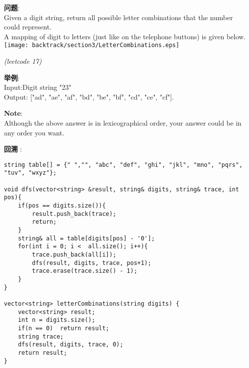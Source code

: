     
\begin{description}
    \item{\textbf{问题}}:\\
Given a digit string, return all possible letter combinations that the number could represent.\\
A mapping of digit to letters (just like on the telephone buttons) is given below.\\

\texttt{[image: backtrack/section3/LetterCombinations.eps]}

\textit{(leetcode 17)}
	\item{\textbf{举例}}:\\
Input:Digit string "23"\\
Output: ["ad", "ae", "af", "bd", "be", "bf", "cd", "ce", "cf"].\\
	\item{\textbf{Note}}:\\
Although the above answer is in lexicographical order, your answer could be in any order you want.
    \item{\textbf{回溯}} : 
    \begin{lstlisting}
string table[] = {" ","", "abc", "def", "ghi", "jkl", "mno", "pqrs", "tuv", "wxyz"};

void dfs(vector<string> &result, string& digits, string& trace, int pos){
	if(pos == digits.size()){
		result.push_back(trace);
		return;
	}
	string& all = table[digits[pos] - '0'];
	for(int i = 0; i <  all.size(); i++){
		trace.push_back(all[i]);
		dfs(result, digits, trace, pos+1);
		trace.erase(trace.size() - 1);
	}
}

vector<string> letterCombinations(string digits) {
	vector<string> result;
	int n = digits.size();
	if(n == 0)	return result;
	string trace;
	dfs(result, digits, trace, 0);	
	return result;
}
    \end{lstlisting}
    \textit{}
\end{description}
